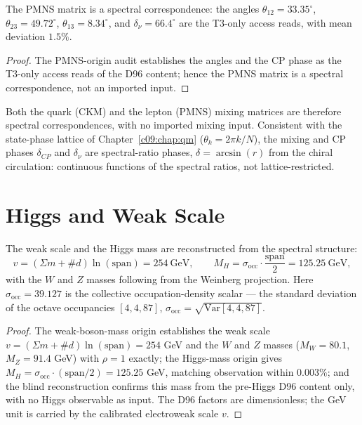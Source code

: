 \begin{theorem}
\label{c11:thm:pmns}
The PMNS matrix is a spectral correspondence: the angles
$\theta_{12} = 33.35^\circ$, $\theta_{23} = 49.72^\circ$, $\theta_{13} = 8.34^\circ$, and
$\delta_\nu = 66.4^\circ$ are the T3-only access reads, with mean deviation $1.5\%$.
\end{theorem}

\begin{proof}
The PMNS-origin audit \cite{c11:QG167} establishes the angles and the CP phase as the
T3-only access reads of the D96 content; hence the PMNS matrix is a spectral
correspondence, not an imported input.
\end{proof}

Both the quark (CKM) and the lepton (PMNS) mixing matrices are therefore spectral
correspondences, with no imported mixing input. Consistent with the state-phase lattice of
Chapter~\ref{c09:chap:qm} ($\theta_k = 2\pi k/N$), the mixing and CP phases
$\delta_{CP}$ and $\delta_\nu$ are spectral-ratio phases, $\delta = \arcsin(r)$ from the
chiral circulation: continuous functions of the spectral ratios, not lattice-restricted.

\section{Higgs and Weak Scale}
\label{c11:sec:higgs}

\begin{theorem}
\label{c11:thm:weak-higgs}
The weak scale and the Higgs mass are reconstructed from the spectral structure:
\begin{equation}
\label{c11:eq:higgs}
v = (\Sigma m+\#d)\ln(\mathrm{span}) = 254\ \mathrm{GeV},
\qquad
M_H = \sigma_{\mathrm{occ}}\cdot\frac{\mathrm{span}}{2} = 125.25\ \mathrm{GeV},
\end{equation}
with the $W$ and $Z$ masses following from the Weinberg projection. Here
$\sigma_{\mathrm{occ}} = 39.127$ is the collective occupation-density scalar --- the
standard deviation of the octave occupancies $[4,4,87]$,
$\sigma_{\mathrm{occ}} = \sqrt{\mathrm{Var}[4,4,87]}$.
\end{theorem}

\begin{proof}
The weak-boson-mass origin \cite{c11:QG168} establishes the weak scale
$v = (\Sigma m+\#d)\ln(\mathrm{span}) = 254$ GeV and the $W$ and $Z$ masses
($M_W = 80.1$, $M_Z = 91.4$ GeV) with $\rho = 1$ exactly; the Higgs-mass origin
\cite{c11:QG169} gives $M_H = \sigma_{\mathrm{occ}}\cdot(\mathrm{span}/2) = 125.25$ GeV,
matching observation within $0.003\%$; and the blind reconstruction \cite{c11:QG176}
confirms this mass from the pre-Higgs D96 content only, with no Higgs observable as input.
The D96 factors are dimensionless; the GeV unit is carried by the calibrated electroweak
scale $v$.
\end{proof}

